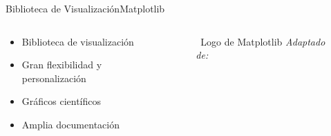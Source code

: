 \begin{frame}{Biblioteca de Visualización}{Matplotlib}
    \begin{columns}
        \begin{column}{0.6\textwidth}
            \begin{itemize}
                \item Biblioteca de visualización
                \item Gran flexibilidad y personalización
                \item Gráficos científicos
                \item Amplia documentación
            \end{itemize}
        \end{column}
        \begin{column}{0.4\textwidth}
            \centering
            \begin{figure}[H]
                \centering
                \vspace{-0.25cm}
                \caption{\tiny~Logo de Matplotlib \textit{Adaptado de:}~\cite{Hunter:2007}}%
                \label{fig:Matplotlib_logo}
            \end{figure}
        \end{column}
    \end{columns}
\end{frame}

